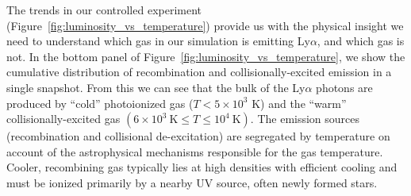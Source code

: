 The trends in our controlled experiment (Figure~\ref{fig:luminosity_vs_temperature}) provide us with the physical insight we need to understand which gas in our simulation is emitting Ly$\alpha$, and which gas is not.
In the bottom panel of Figure~\ref{fig:luminosity_vs_temperature}, we show the cumulative distribution of recombination and collisionally-excited emission in a single snapshot.
From this we can see that the bulk of the Ly$\alpha$ photons are produced by ``cold'' photoionized gas ($T < 5\times 10^3$ K) and the ``warm'' collisionally-excited gas $(6\times10^3\ \mathrm{K} \leq T \leq 10^4\ \mathrm{K})$.
The emission sources (recombination and collisional de-excitation) are segregated by temperature on account of the astrophysical mechanisms responsible for the gas temperature.
Cooler, recombining gas typically lies at high densities with efficient cooling and must be ionized primarily by a nearby UV source, often newly formed stars.


